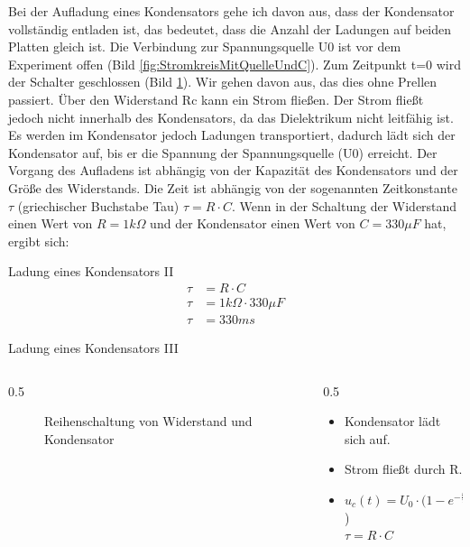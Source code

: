Bei der Aufladung eines Kondensators gehe ich davon aus, dass der Kondensator vollständig entladen ist, das bedeutet, dass die Anzahl der Ladungen auf beiden Platten gleich ist. Die Verbindung zur Spannungsquelle U0 ist vor dem Experiment offen (Bild \ref{fig:StromkreisMitQuelleUndC}). Zum Zeitpunkt t=0 wird der Schalter geschlossen (Bild \ref{fig:StromkreisMitQuelleUndC2}). Wir gehen davon aus, das dies ohne Prellen passiert. Über den Widerstand Rc kann ein Strom fließen. Der Strom fließt jedoch nicht innerhalb des Kondensators, da das Dielektrikum nicht leitfähig ist. Es werden im Kondensator jedoch Ladungen transportiert, dadurch lädt sich der Kondensator auf, bis er die Spannung der Spannungsquelle (U0) erreicht. Der Vorgang des Aufladens ist abhängig von der Kapazität des Kondensators und der Größe des Widerstands. Die Zeit ist abhängig von der sogenannten Zeitkonstante $\tau$ (griechischer Buchstabe Tau) $\tau = R\cdot C$. Wenn in der Schaltung der Widerstand einen Wert von $R = 1k\Omega$ und der Kondensator einen Wert von $C = 330\mu F$ hat, ergibt sich:

\begin{frame}{Ladung eines Kondensators II}
\begin{align}
\tau &= R\cdot C \\
\tau &= 1k\Omega \cdot 330\mu F\\
\tau &= 330 ms
\end{align}
\end{frame}

\begin{frame}{Ladung eines Kondensators III}
  \begin{columns}
    \begin{column}{0.5\textwidth}
     \begin{figure}[htb]
    \caption{Reihenschaltung von Widerstand und Kondensator}
    \label{fig:StromkreisMitQuelleUndC2}
  \end{figure}
    \end{column}
    \begin{column}{0.5\textwidth}
      \begin{itemize}
        \item Kondensator lädt sich auf.
        \item Strom fließt durch R.
        \item $u_c (t) = U_0  \cdot (1 - e^{-\frac{t}{\tau}}$)\\
              $\tau = R \cdot C$
      \end{itemize}
    \end{column}
  \end{columns}
\end{frame}

